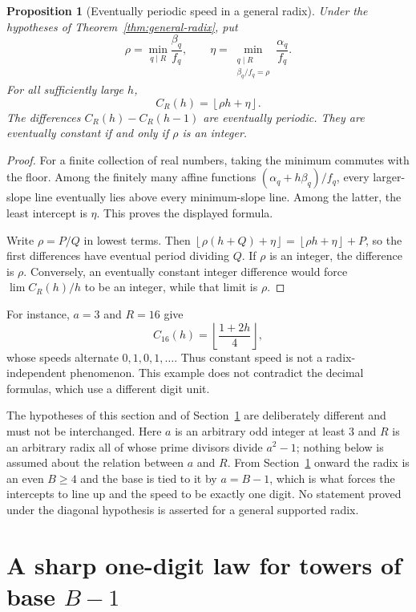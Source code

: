 \documentclass[11pt,letterpaper]{article}
\numberwithin{equation}{section}
\newtheorem{proposition}[theorem]{Proposition}
\theoremstyle{definition}
\theoremstyle{remark}
\newcommand{\floor}[1]{\left\lfloor #1\right\rfloor}
\begin{document}
\begin{proposition}[Eventually periodic speed in a general radix]\label{prop:periodic}
Under the hypotheses of Theorem~\ref{thm:general-radix}, put
\[
 \rho=\min_{q\mid R}\frac{\beta_q}{f_q},\qquad
 \eta=\min_{\substack{q\mid R\\ \beta_q/f_q=\rho}}
             \frac{\alpha_q}{f_q}.
\]
For all sufficiently large $h$,
\[
 C_R(h)=\floor{\rho h+\eta}.
\]
The differences $C_R(h)-C_R(h-1)$ are eventually periodic. They are eventually constant if and only if $\rho$ is an integer.
\end{proposition}
\begin{proof}
For a finite collection of real numbers, taking the minimum commutes with the floor. Among the finitely many affine functions
$(\alpha_q+h\beta_q)/f_q$, every larger-slope line eventually lies above every minimum-slope line. Among the latter, the least intercept is $\eta$. This proves the displayed formula.

Write $\rho=P/Q$ in lowest terms. Then
$\floor{\rho(h+Q)+\eta}=\floor{\rho h+\eta}+P$, so the first differences have eventual period dividing $Q$. If $\rho$ is an integer, the difference is $\rho$. Conversely, an eventually constant integer difference would force $\lim C_R(h)/h$ to be an integer, while that limit is $\rho$.
\end{proof}

For instance, $a=3$ and $R=16$ give
\[
 C_{16}(h)=\floor{\frac{1+2h}{4}},
\]
whose speeds alternate $0,1,0,1,\ldots$. Thus constant speed is not a radix-independent phenomenon. This example does not contradict the decimal formulas, which use a different digit unit.

The hypotheses of this section and of Section~\ref{sec:sharp} are deliberately different and must not be interchanged. Here $a$ is an arbitrary odd integer at least $3$ and $R$ is an arbitrary radix all of whose prime divisors divide $a^2-1$; nothing below is assumed about the relation between $a$ and $R$. From Section~\ref{sec:sharp} onward the radix is an even $B\ge4$ and the base is tied to it by $a=B-1$, which is what forces the intercepts to line up and the speed to be exactly one digit. No statement proved under the diagonal hypothesis is asserted for a general supported radix.

\section{A sharp one-digit law for towers of base \texorpdfstring{$B-1$}{B-1}}\label{sec:sharp}
\end{document}
